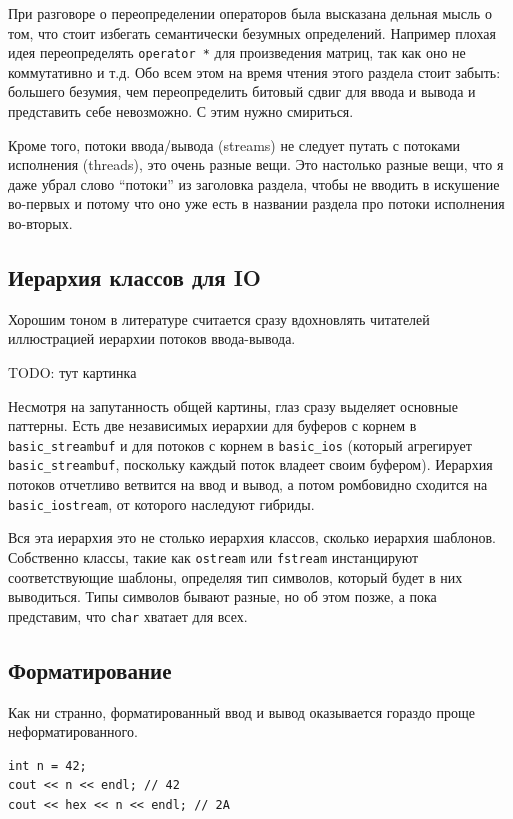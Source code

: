 \documentclass[a4paper,12pt,oneside]{book}
\begin{document}
При разговоре о переопределении операторов была высказана дельная мысль о том, что стоит избегать семантически безумных определений. Например плохая идея переопределять \lstinline!operator *! для произведения матриц, так как оно не коммутативно и т.д. Обо всем этом на время чтения этого раздела стоит забыть: большего безумия, чем переопределить битовый сдвиг для ввода и вывода и представить себе невозможно. С этим нужно смириться.

Кроме того, потоки ввода/вывода (streams) не следует путать с потоками исполнения (threads), это очень разные вещи. Это настолько разные вещи, что я даже убрал слово ``потоки'' из заголовка раздела, чтобы не вводить в искушение во-первых и потому что оно уже есть в названии раздела про потоки исполнения во-вторых.

\subsection{Иерархия классов для IO}

Хорошим тоном в литературе считается сразу вдохновлять читателей иллюстрацией иерархии потоков ввода-вывода.

TODO: тут картинка

Несмотря на запутанность общей картины, глаз сразу выделяет основные паттерны. Есть две независимых иерархии для буферов с корнем в \lstinline!basic_streambuf! и для потоков с корнем в \lstinline!basic_ios! (который агрегирует \lstinline!basic_streambuf!, поскольку каждый поток владеет своим буфером). Иерархия потоков отчетливо ветвится на ввод и вывод, а потом ромбовидно сходится на \lstinline!basic_iostream!, от которого наследуют гибриды.

Вся эта иерархия это не столько иерархия классов, сколько иерархия шаблонов. Собственно классы, такие как \lstinline!ostream! или \lstinline!fstream! инстанцируют соответствующие шаблоны, определяя тип символов, который будет в них выводиться. Типы символов бывают разные, но об этом позже, а пока представим, что \lstinline!char! хватает для всех.

\subsection{Форматирование}\label{FormattedIO}

Как ни странно, форматированный ввод и вывод оказывается гораздо проще неформатированного.

\begin{lstlisting}
int n = 42;
cout << n << endl; // 42
cout << hex << n << endl; // 2A
\end{lstlisting}
\end{document}
